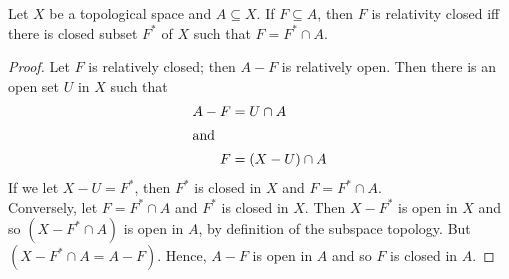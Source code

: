 \documentclass[../main-sheet.tex]{subfiles}
\begin{document}
\begin{thm}
    Let  \(X\) be a topological space and  \(A\subseteq X\). If  \(F\subseteq A\), then  \(F\) is relativity closed iff there is closed subset  \(F^{*}\) of  \(X\) such that  \(F=F^{*}\cap A\).
\end{thm}
\begin{proof}
    Let  \(F\) is relatively closed; then  \(A-F\) is relatively open. Then there is an open set  \(U\) in  \(X\) such that 
    \begin{align*}
        A-F&=U\cap A\\
        \intertext{and}
        F&=(X-U)\cap A
    \end{align*}
    If we let  \(X-U=F^{*}\), then  \(F^{*}\) is closed in  \(X\) and  \(F=F^{*}\cap A\).\\
    Conversely, let  \(F=F^{*}\cap A\) and  \(F^{*}\) is closed in  \(X\). Then  \(X-F^{*}\) is open in  \(X\) and so  \((X-F^{*}\cap A)\) is open in  \(A\), by definition of the subspace topology. But  \((X-F^{*}\cap A=A-F)\). Hence,  \(A-F\) is open in  \(A\) and so  \(F\) is closed in  \(A\).
\end{proof}
\end{document}
